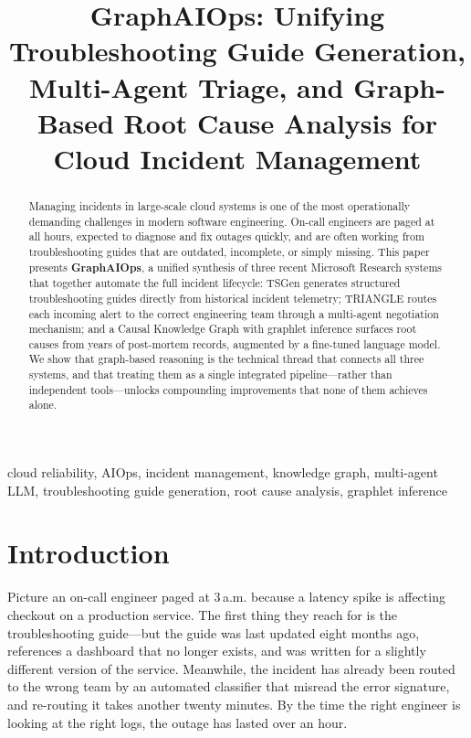 \documentclass[conference]{IEEEtran}
\begin{document}
\title{GraphAIOps: Unifying Troubleshooting Guide Generation,
Multi-Agent Triage, and Graph-Based Root Cause Analysis
for Cloud Incident Management}

\author{
}

\maketitle

\begin{abstract}
Managing incidents in large-scale cloud systems is one of the most operationally
demanding challenges in modern software engineering.
On-call engineers are paged at all hours, expected to diagnose and fix outages
quickly, and are often working from troubleshooting guides that are outdated,
incomplete, or simply missing.
This paper presents \textbf{GraphAIOps}, a unified synthesis of three recent
Microsoft Research systems that together automate the full incident lifecycle:
TSGen generates structured troubleshooting guides directly from historical
incident telemetry; TRIANGLE routes each incoming alert to the correct engineering
team through a multi-agent negotiation mechanism; and a Causal Knowledge Graph
with graphlet inference surfaces root causes from years of post-mortem records,
augmented by a fine-tuned language model.
We show that graph-based reasoning is the technical thread that connects all three
systems, and that treating them as a single integrated pipeline---rather than
independent tools---unlocks compounding improvements that none of them achieves alone.
\end{abstract}

\begin{IEEEkeywords}
cloud reliability, AIOps, incident management, knowledge graph, multi-agent LLM,
troubleshooting guide generation, root cause analysis, graphlet inference
\end{IEEEkeywords}


\section{Introduction}

Picture an on-call engineer paged at 3\,a.m. because a latency spike is affecting
checkout on a production service. The first thing they reach for is the
troubleshooting guide---but the guide was last updated eight months ago, references
a dashboard that no longer exists, and was written for a slightly different version
of the service. Meanwhile, the incident has already been routed to the wrong team
by an automated classifier that misread the error signature, and re-routing it
takes another twenty minutes. By the time the right engineer is looking at the right
logs, the outage has lasted over an hour.
\end{document}
